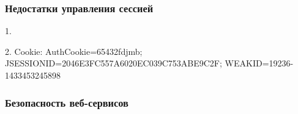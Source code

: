 \documentclass[10pt,a4paper]{article}
\begin{document}
\subsubsection{Недостатки управления сессией}

1. 

2. Cookie: AuthCookie=65432fdjmb; JSESSIONID=2046E3FC557A6020EC039C753ABE9C2F; WEAKID=19236-1433453245898

\subsubsection{Безопасность веб-сервисов}
\end{document}
